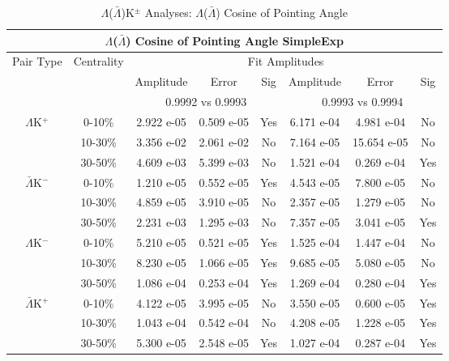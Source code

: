 \documentclass[../AnalysisNoteJBuxton.tex]{subfiles}
\begin{document}
\begin{table}
 \centering
 \begin{tabular}{|c|c|c|c|c||c|c|c|}
  \multicolumn{8}{c}{$\Lambda$($\bar{\Lambda}$) Cosine of Pointing Angle SimpleExp} \\
  \hline
  \multirow{3}{*}{Pair Type} & \multirow{3}{*}{Centrality} & \multicolumn{6}{c|}{Fit Amplitudes} \\
  \cline{3-8}
   & & Amplitude & Error & Sig & Amplitude & Error & Sig \\  
  \cline{3-8}
   & & \multicolumn{3}{c||}{0.9992 vs 0.9993} & \multicolumn{3}{c|}{0.9993 vs 0.9994} \\  
  \hline
  \multirow{3}{*}{$\Lambda$K$^{+}$}
   &  0-10\% & 2.922 e-05 & 0.509 e-05 & Yes & 6.171 e-04 & 4.981 e-04 & No \\
   & 10-30\% & 3.356 e-02 & 2.061 e-02 & No & 7.164 e-05 & 15.654 e-05 & No \\
   & 30-50\% & 4.609 e-03 & 5.399 e-03 & No & 1.521 e-04 & 0.269 e-04 & Yes \\
  \hline
  \multirow{3}{*}{$\bar{\Lambda}$K$^{-}$}
   &  0-10\% & 1.210 e-05 & 0.552 e-05 & Yes & 4.543 e-05 & 7.800 e-05 & No \\
   & 10-30\% & 4.859 e-05 & 3.910 e-05 & No & 2.357 e-05 & 1.279 e-05 & No \\
   & 30-50\% & 2.231 e-03 & 1.295 e-03 & No & 7.357 e-05 & 3.041 e-05 & Yes \\
  \hline \hline
  \multirow{3}{*}{$\Lambda$K$^{-}$}
   &  0-10\% & 5.210 e-05 & 0.521 e-05 & Yes & 1.525 e-04 & 1.447 e-04 & No \\
   & 10-30\% & 8.230 e-05 & 1.066 e-05 & Yes & 9.685 e-05 & 5.080 e-05 & No \\
   & 30-50\% & 1.086 e-04 & 0.253 e-04 & Yes & 1.269 e-04 & 0.280 e-04 & Yes \\
  \hline
  \multirow{3}{*}{$\bar{\Lambda}$K$^{+}$}
   &  0-10\% & 4.122 e-05 & 3.995 e-05 & No & 3.550 e-05 & 0.600 e-05 & Yes \\
   & 10-30\% & 1.043 e-04 & 0.542 e-04 & No & 4.208 e-05 & 1.228 e-05 & Yes \\
   & 30-50\% & 5.300 e-05 & 2.548 e-05 & Yes & 1.027 e-04 & 0.287 e-04 & Yes \\
  \hline
 \end{tabular}
 \caption{$\Lambda$($\bar{\Lambda}$)K$^{\pm}$ Analyses: $\Lambda$($\bar{\Lambda}$) Cosine of Pointing Angle}
 \label{tab:LamCosPointingAngleLamKch_SimpleExp}
\end{table}
\end{document}
